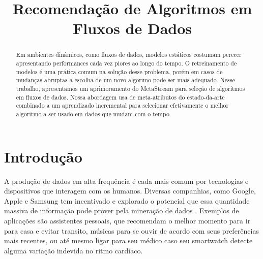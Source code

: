 \documentclass[conference,compsoc]{IEEEtran}
\begin{document}
%
\title{Recomendação de Algoritmos em Fluxos de Dados}


\author{
\and
{}
}

\maketitle


\begin{abstract}
Em ambientes dinâmicos, como fluxos de dados, modelos estáticos costumam perecer apresentando performances cada vez piores ao longo do tempo. O retreinamento de modelos é uma prática comum na solução desse problema, porém em casos de mudanças abruptas a escolha de um novo algorimo pode ser mais adequado. Nesse trabalho, apresentamos um aprimoramento do MetaStream para seleção de algoritmos em fluxos de dados. Nossa abordagem usa de meta-atributos do estado-da-arte combinado a um aprendizado incremental para selecionar efetivamente o melhor algoritmo a ser usado em dados que mudam com o tempo.
\end{abstract}

\IEEEpeerreviewmaketitle

\section{Introdução}
\label{intro}
A produção de dados em alta frequência é cada mais comum por tecnologias e dispositivos que interagem com os humanos. Diversas companhias, como Google, Apple e Samsung tem incentivado e explorado o potencial que essa quantidade massiva de informação pode prover pela mineração de dados \cite{tarnoff2018big}.
Exemplos de aplicações são assistentes pessoais, que recomendam o melhor momento para ir para casa e evitar transito, músicas para se ouvir de acordo com seus preferências mais recentes, ou até mesmo ligar para seu médico caso seu smartwatch detecte alguma variação indevida no ritmo cardíaco.
\end{document}
